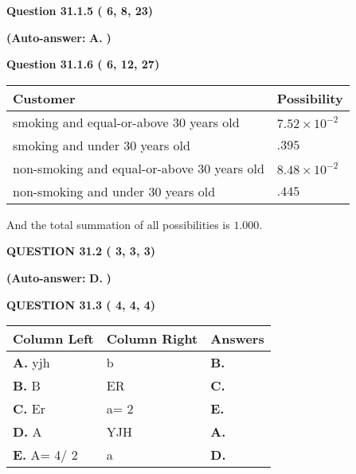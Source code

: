 \documentclass[12pt]{article}
\begin{document}
 
  
  
{\textbf{\large{Question
31.1.5 
 (          6,          8,         23)
}}}
 
 
{\textbf{(Auto-answer:}}
{\textbf{\large{
A.}}}
{\textbf{)}}
 
 
  
  
{\textbf{\large{Question
31.1.6 
 (          6,         12,         27)
}}}

 
\noindent
\begin{tabular}{|l|l|}
\hline
Customer & Possibility \\
\hline
smoking  and  %
equal-or-above 30 years old &
  $ %
7.52 \times 10^{-2}$ \\
\hline
smoking  and  %
under 30 years old &
  $ %
.395$ \\
\hline
 non-smoking and  %
equal-or-above 30 years old &
  $ %
8.48 \times 10^{-2}$ \\
\hline
 non-smoking and  %
under 30 years old &
  $ %
.445$ \\
\hline
\end{tabular}
 
\noindent
 And the total summation of all possibilities is $  %
1.000 $.
 
  
  
{\textbf{\large{QUESTION
31.2 
 (          3,          3,          3)
}}}
 
 
{\textbf{(Auto-answer:}}
{\textbf{\large{
D.}}}
{\textbf{)}}
 
 
  
  
{\textbf{\large{QUESTION
31.3 
 (          4,          4,          4)
}}}
 
 
\noindent{}
  
  
\begin{tabular}{|l|l|l|}
 \hline
 Column Left & Column Right  & Answers       \\ 
 \hline
{\textbf{\large{
A.}}}
yjh
  & 
b
 & 
{\textbf{\large{
B.}}}
 \\ 
 \hline
{\textbf{\large{
B.}}}
B
  & 
ER
 & 
{\textbf{\large{
C.}}}
 \\ 
 \hline
{\textbf{\large{
C.}}}
Er
  & 
 a= %
2
 & 
{\textbf{\large{
E.}}}
 \\ 
 \hline
{\textbf{\large{
D.}}}
A
  & 
YJH
 & 
{\textbf{\large{
A.}}}
 \\ 
 \hline
{\textbf{\large{
E.}}}
 A= %
4/ %
2

  & 
a
 & 
{\textbf{\large{
D.}}}
 \\ 
 \hline
 \end{tabular}
  
\end{document}
